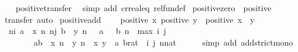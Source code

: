 \begin{isabellebody}
%
\isadelimproof
\ \ %
\endisadelimproof
%
\isatagproof
{}\isamarkupfalse%
\ positive{\isachardot}{\kern0pt}transfer\ \isamarkupfalse%
\ {\isacharparenleft}{\kern0pt}simp\ add{\isacharcolon}{\kern0pt}\ cr{\isacharunderscore}{\kern0pt}real{\isacharunderscore}{\kern0pt}eq\ rel{\isacharunderscore}{\kern0pt}fun{\isacharunderscore}{\kern0pt}def{\isacharparenright}{\kern0pt}%
\endisatagproof
{\isafoldproof}%
%
\isadelimproof
\isanewline
%
\endisadelimproof
\isanewline
{}\isamarkupfalse%
\ positive{\isacharunderscore}{\kern0pt}zero{\isacharcolon}{\kern0pt}\ {\isachardoublequoteopen}{\isasymnot}\ positive\ {}{\isachardoublequoteclose}\isanewline
%
\isadelimproof
\ \ %
\endisadelimproof
%
\isatagproof
{}\isamarkupfalse%
\ transfer\ auto%
\endisatagproof
{\isafoldproof}%
%
\isadelimproof
\isanewline
%
\endisadelimproof
\isanewline
{}\isamarkupfalse%
\ positive{\isacharunderscore}{\kern0pt}add{\isacharcolon}{\kern0pt}\ \isanewline
\ \ \ {\isachardoublequoteopen}positive\ x{\isachardoublequoteclose}\ {\isachardoublequoteopen}positive\ y{\isachardoublequoteclose}\ \ {\isachardoublequoteopen}positive\ {\isacharparenleft}{\kern0pt}x\ {\isacharplus}{\kern0pt}\ y{\isacharparenright}{\kern0pt}{\isachardoublequoteclose}\isanewline
%
\isadelimproof
%
\endisadelimproof
%
\isatagproof
{}\isamarkupfalse%
\ {\isacharminus}{\kern0pt}\isanewline
\ \ \isamarkupfalse%
\ {\isacharasterisk}{\kern0pt}{\isacharcolon}{\kern0pt}\ {\isachardoublequoteopen}{\isasymlbrakk}{\isasymforall}n{\isasymge}i{\isachardot}{\kern0pt}\ a\ {\isacharless}{\kern0pt}\ x\ n{\isacharsemicolon}{\kern0pt}\ {\isasymforall}n{\isasymge}j{\isachardot}{\kern0pt}\ b\ {\isacharless}{\kern0pt}\ y\ n{\isacharsemicolon}{\kern0pt}\ {}\ {\isacharless}{\kern0pt}\ a{\isacharsemicolon}{\kern0pt}\ {}\ {\isacharless}{\kern0pt}\ b{\isacharsemicolon}{\kern0pt}\ n\ {\isasymge}\ max\ i\ j{\isasymrbrakk}\isanewline
\ \ \ \ \ \ \ {\isasymLongrightarrow}\ a{\isacharplus}{\kern0pt}b\ {\isacharless}{\kern0pt}\ x\ n\ {\isacharplus}{\kern0pt}\ y\ n{\isachardoublequoteclose}\ \ x\ y\ \ a\ b{\isacharcolon}{\kern0pt}{\isacharcolon}{\kern0pt}rat\ \ i\ j\ n{\isacharcolon}{\kern0pt}{\isacharcolon}{\kern0pt}nat\isanewline
\ \ \ \ \isamarkupfalse%
\ {\isacharparenleft}{\kern0pt}simp\ add{\isacharcolon}{\kern0pt}\ add{\isacharunderscore}{\kern0pt}strict{\isacharunderscore}{\kern0pt}mono{\isacharparenright}{\kern0pt}\isanewline

\end{isabellebody}
